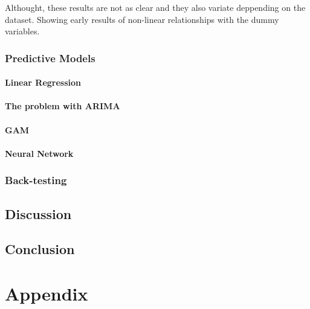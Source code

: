 \documentclass[11pt,english,a4paper,hidelinks]{book}
\begin{document}
\noindent Althought, these results are not as clear and they also variate deppending on the dataset. Showing early results of non-linear relationships with the dummy variables.

\section{Predictive Models}

\subsection{Linear Regression}

\subsection{The problem with ARIMA}

\subsection{GAM}

\subsection{Neural Network}

\section{Back-testing}



\chapter{Discussion}

\chapter{Conclusion}

\printbibliography[heading=bibintoc, title=Bibliography]
\label{sec:biblio}
\newpage

\part{Appendix}
\end{document}
